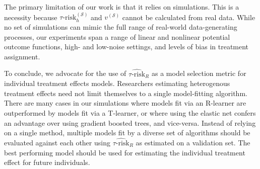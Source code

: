 The primary limitation of our work is that it relies on simulations. This is a necessity because $\tau\text{-risk}_{h}^{(\mathcal{S})}$ and $v^{\mathcal{(S)}}$ cannot be calculated from real data. While no set of simulations can mimic the full range of real-world data-generating processes, our experiments span a range of linear and nonlinear potential outcome functions, high- and low-noise settings, and levels of bias in treatment assignment. 

To conclude, we advocate for the use of $\widehat{\tau\text{-risk}}_{R}$ as a model selection metric for individual treatment effects models. Researchers estimating heterogenous treatment effects need not limit themselves to a single model-fitting algorithm. There are many cases in our simulations where models fit via an R-learner are outperformed by models fit via a T-learner, or where using the elastic net confers an advantage over using gradient boosted trees, and vice-versa. Instead of relying on a single method, multiple models fit by a diverse set of algorithms should be evaluated against each other using $\widehat{\tau\text{-risk}}_{R}$ as estimated on a validation set. The best performing model should be used for estimating the individual treatment effect for future individuals.


